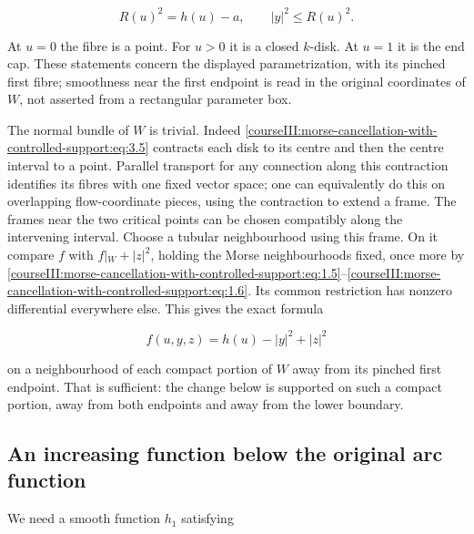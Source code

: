 \begin{equation}
R(u)^2=h(u)-a,
\qquad |y|^2\leq R(u)^2.
\label{courseIII:morse-cancellation-with-controlled-support:eq:3.6}
\end{equation}

At \(u=0\) the fibre is a point. For \(u>0\) it is a closed \(k\)-disk. At \(u=1\) it is the end cap. These statements concern the displayed parametrization, with its pinched first fibre; smoothness near the first endpoint is read in the original coordinates of \(W\), not asserted from a rectangular parameter box.

The normal bundle of \(W\) is trivial. Indeed \eqref{courseIII:morse-cancellation-with-controlled-support:eq:3.5} contracts each disk to its centre and then the centre interval to a point. Parallel transport for any connection along this contraction identifies its fibres with one fixed vector space; one can equivalently do this on overlapping flow-coordinate pieces, using the contraction to extend a frame. The frames near the two critical points can be chosen compatibly along the intervening interval. Choose a tubular neighbourhood using this frame. On it compare \(f\) with \(f|_W+|z|^2\), holding the Morse neighbourhoods fixed, once more by \eqref{courseIII:morse-cancellation-with-controlled-support:eq:1.5}--\eqref{courseIII:morse-cancellation-with-controlled-support:eq:1.6}. Its common restriction has nonzero differential everywhere else. This gives the exact formula

\begin{equation}
f(u,y,z)=h(u)-|y|^2+|z|^2
\label{courseIII:morse-cancellation-with-controlled-support:eq:3.7}
\end{equation}

on a neighbourhood of each compact portion of \(W\) away from its pinched first endpoint. That is sufficient: the change below is supported on such a compact portion, away from both endpoints and away from the lower boundary.

\subsection{An increasing function below the original arc function}
\label{courseIII:morse-cancellation-with-controlled-support:morse-monotone-minorant}

\label{courseIII:morse-cancellation-with-controlled-support:section-4}

We need a smooth function \(h_1\) satisfying

